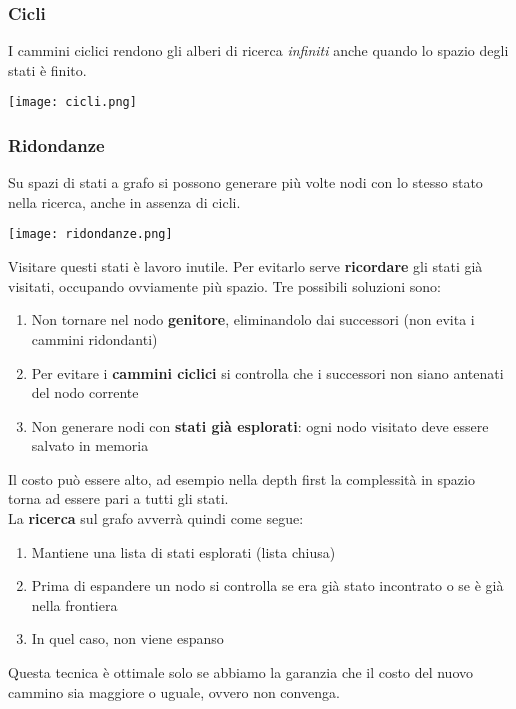 \subsubsection{Cicli}
I cammini ciclici rendono gli alberi di ricerca \emph{infiniti} anche quando lo spazio degli stati è finito.
\begin{center}
	\texttt{[image: cicli.png]}
\end{center}
\subsubsection{Ridondanze}
Su spazi di stati a grafo si possono generare più volte nodi con lo stesso stato nella ricerca, anche in assenza di cicli.
\begin{center}
	\texttt{[image: ridondanze.png]}
\end{center}
Visitare questi stati è lavoro inutile. Per evitarlo serve \textbf{ricordare} gli stati già visitati, occupando ovviamente più spazio. Tre possibili soluzioni sono:
\begin{enumerate}
	\item Non tornare nel nodo \textbf{genitore}, eliminandolo dai successori (non evita i cammini ridondanti)
	\item Per evitare i \textbf{cammini ciclici} si controlla che  i successori non siano antenati del nodo corrente
	\item Non generare nodi con \textbf{stati già esplorati}: ogni nodo visitato deve essere salvato in memoria
\end{enumerate}
Il costo può essere alto, ad esempio nella depth first la complessità in spazio torna ad essere pari a tutti gli stati.\\
La \textbf{ricerca} sul grafo avverrà quindi come segue:
\begin{enumerate}
	\item Mantiene una lista di stati esplorati (lista chiusa)
	\item Prima di espandere un nodo si controlla se era già stato incontrato o se è già nella frontiera
	\item In quel caso, non viene espanso
\end{enumerate}
Questa tecnica è ottimale solo se abbiamo la garanzia che il costo del nuovo cammino sia maggiore o uguale, ovvero non convenga.
